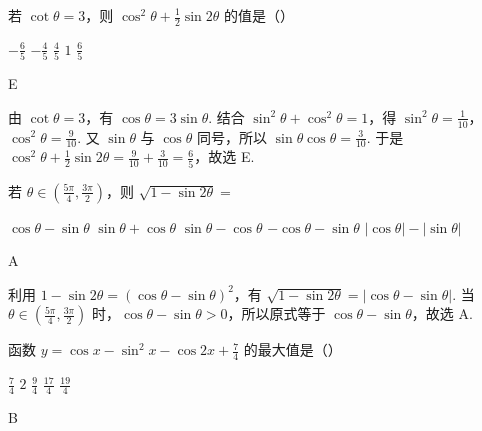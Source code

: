 \documentclass[UTF8,a4paper,oneside,11pt]{ctexbook}
\begin{document}
\begin{problem}

若 \(\cot\theta=3 \)，则 \(\cos^{2}\theta+\frac{1}{2}\sin2\theta \) 的值是（\quad）

\choicesfive
    {\(-\frac{6}{5} \)}
    {\(-\frac{4}{5} \)}
    {\(\frac{4}{5} \)}
    {\(1\)}
    {\(\frac{6}{5} \)}
\end{problem}

\begin{answer}
E
\end{answer}

\begin{solution}
由 \(\cot\theta=3\)，有 \(\cos\theta=3\sin\theta\). 结合 \(\sin^2\theta+\cos^2\theta=1\)，得 \(\sin^2\theta=\frac{1}{10}\)，\(\cos^2\theta=\frac{9}{10}\). 又 \(\sin\theta\) 与 \(\cos\theta\) 同号，所以 \(\sin\theta\cos\theta=\frac{3}{10}\). 于是 \(\cos^2\theta+\frac{1}{2}\sin2\theta=\frac{9}{10}+\frac{3}{10}=\frac{6}{5}\)，故选 E.
\end{solution}

\begin{problem}

若 \(\theta \in \left(\frac{5\pi}{4}, \frac{3\pi}{2} \right) \)，则 \(\sqrt{1 - \sin 2\theta} = \)

\choicesfive
    {\(\cos\theta-\sin\theta\)}
    {\(\sin\theta+\cos\theta\)}
    {\(\sin\theta-\cos\theta\)}
    {\(-\cos\theta-\sin\theta\)}
    {\(\left|\cos\theta\right|-\left|\sin\theta\right|\)}
\end{problem}

\begin{answer}
A
\end{answer}

\begin{solution}
利用 \(1-\sin2\theta=(\cos\theta-\sin\theta)^2\)，有 \(\sqrt{1-\sin2\theta}=|\cos\theta-\sin\theta|\). 当 \(\theta\in\left(\frac{5\pi}{4},\frac{3\pi}{2}\right)\) 时，\(\cos\theta-\sin\theta>0\)，所以原式等于 \(\cos\theta-\sin\theta\)，故选 A.
\end{solution}

\begin{problem}

函数 \(y = \cos x - \sin^2 x - \cos 2x + \frac{7}{4} \) 的最大值是（\quad）

\choicesfive
    {\(\frac{7}{4} \)}
    {\(2\)}
    {\(\frac{9}{4} \)}
    {\(\frac{17}{4} \)}
    {\(\frac{19}{4} \)}
\end{problem}

\begin{answer}
B
\end{answer}
\end{document}
